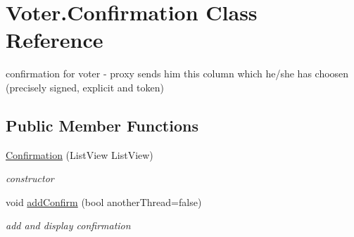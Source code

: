 \hypertarget{class_voter_1_1_confirmation}{}\section{Voter.\+Confirmation Class Reference}
\label{class_voter_1_1_confirmation}


confirmation for voter -\/ proxy sends him this column which he/she has choosen (precisely signed, explicit and token)  


\subsection*{Public Member Functions}
\begin{DoxyCompactItemize}
\item 
\hyperlink{class_voter_1_1_confirmation_a4198211143ac69c299dd18bb5bb30fa0}{Confirmation} (List\+View List\+View)
\begin{DoxyCompactList}\small\item\em constructor \end{DoxyCompactList}\item 
void \hyperlink{class_voter_1_1_confirmation_a13b96bc4ec497733db0f2d1a820158d0}{add\+Confirm} (bool another\+Thread=false)
\begin{DoxyCompactList}\small\item\em add and display confirmation \end{DoxyCompactList}\end{DoxyCompactItemize}
